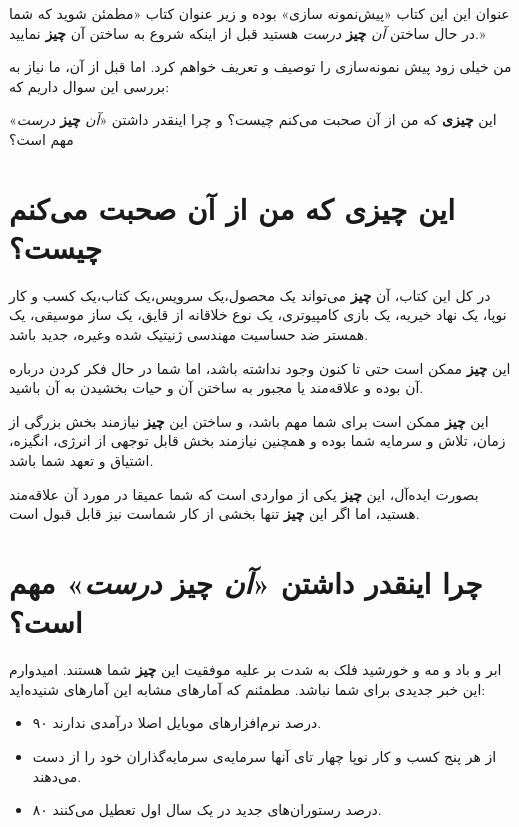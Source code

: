 عنوان این این کتاب «پیش‌نمونه سازی» بوده و زیر عنوان کتاب «مطمئن شوید که
شما در حال ساختن \emph{آن} \textbf{چیز} \emph{درست} هستید قبل از اینکه
شروع به ساختن آن \textbf{چیز} نمایید.»

من خیلی زود پیش نمونه‌سازی را توصیف و تعریف خواهم کرد. اما قبل از آن، ما
نیاز به بررسی این سوال داریم که:

این \textbf{چیزی} که من از آن صحبت می‌کنم چیست؟ و چرا اینقدر داشتن
«\emph{آن} \textbf{چیز} \emph{درست}» مهم است؟

\section{این \textbf{چیزی} که من از آن صحبت می‌کنم
چیست؟}\label{ux627ux6ccux646-ux686ux6ccux632ux6cc-ux6a9ux647-ux645ux646-ux627ux632-ux622ux646-ux635ux62dux628ux62a-ux645ux6ccux6a9ux646ux645-ux686ux6ccux633ux62a}

در کل این کتاب، آن \textbf{چیز} می‌تواند یک محصول،یک سرویس،یک کتاب،یک
کسب و کار نوپا، یک نهاد خیریه، یک بازی کامپیوتری، یک نوع خلاقانه از
قایق، یک ساز موسیقی، یک همستر ضد حساسیت مهندسی ژنیتیک شده وغیره، جدید
باشد.

این \textbf{چیز} ممکن است حتی تا کنون وجود نداشته باشد، اما شما در حال
فکر کردن درباره آن بوده و علاقه‌مند یا مجبور به ساختن آن و حیات بخشیدن
به آن باشید.

این \textbf{چیز} ممکن است برای شما مهم باشد، و ساختن این \textbf{چیز}
نیازمند بخش بزرگی از زمان، تلاش و سرمایه شما بوده و همچنین نیازمند بخش
قابل توجهی از انرژی، انگیزه، اشتیاق و تعهد شما باشد.

بصورت ایده‌آل، این \textbf{چیز} یکی از مواردی است که شما عمیقا در مورد
آن علاقه‌مند هستید، اما اگر این \textbf{چیز} تنها بخشی از کار شماست نیز
قابل قبول است.

\section{چرا اینقدر داشتن «\emph{آن} \textbf{چیز} \emph{درست}» مهم
است؟}\label{ux686ux631ux627-ux627ux6ccux646ux642ux62fux631-ux62fux627ux634ux62aux646-ux622ux646-ux686ux6ccux632-ux62fux631ux633ux62a-ux645ux647ux645-ux627ux633ux62a}

ابر و باد و مه و خورشید فلک به شدت بر علیه موفقیت این \textbf{چیز} شما
هستند. امیدوارم این خبر جدیدی برای شما نباشد. مطمئنم که آمارهای مشابه
این آمارهای شنیده‌اید:

\begin{itemize}

\item
  ۹۰ درصد نرم‌افزارهای موبایل اصلا درآمدی ندارند.
\item
  از هر پنج کسب و کار نوپا چهار تای آنها سرمایه‌ی سرمایه‌گذاران خود را
  از دست می‌دهند.
\item
  ۸۰ درصد رستوران‌های جدید در یک سال اول تعطیل می‌کنند.
\end{itemize}


